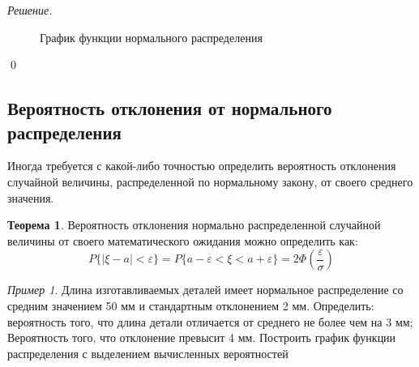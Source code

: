 \documentclass[12pt,a4paper]{article}
\theoremstyle{definition}
\theoremstyle{definition}
\newtheorem{theorem}{Теорема}[section]
\theoremstyle{remark}
\theoremstyle{corollary}
\theoremstyle{bolditalic}
\newtheorem{example}{Пример}[section]
\newenvironment{solution}{
    \vspace{0.5em}
    \noindent\textit{Решение.}
}{\qed\vspace{1em}}
\begin{document}
\begin{solution}
\begin{figure}[h!]
\caption{График функции нормального распределения}
\end{figure}

\end{solution}


\subsection{Вероятность отклонения от нормального распределения}

Иногда требуется с какой-либо точностью определить вероятность отклонения случайной величины, распределенной по нормальному закону, от своего среднего значения.

\begin{theorem}
    Вероятность отклонения нормально распределенной случайной величины от своего математического ожидания можно определить как:
    \[
    P\{|\xi-a|<\varepsilon\}=P\{a-\varepsilon<\xi<a+\varepsilon\}=2\Phi\left(\frac{\varepsilon}{\sigma}\right)
    \]
\end{theorem}

\begin{example}
Длина изготавливаемых деталей имеет нормальное распределение со средним значением 50 мм и стандартным отклонением 2 мм. Определить: вероятность того, что длина детали отличается от среднего не более чем на 3 мм; Вероятность того, что отклонение превысит 4 мм. Построить график функции распределения с выделением вычисленных вероятностей
\end{example}
\end{document}

